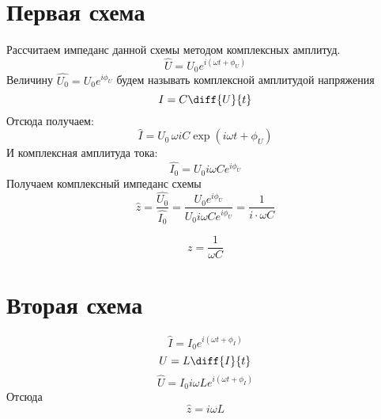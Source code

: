



\def\labauthors{Понур К.А., Сарафанов Ф.Г., Сидоров Д.А.}
\def\labgroup{420}
\def\labnumber{210}
\def\labtheme{Исследование линейных двухполюсников и четырёхполюсников}
\renewcommand{\vec}{\mathbf}
\renewcommand{\Re}{\operatorname{Re}}
\renewcommand{\Im}{\operatorname{Im}}



\tableofcontents
\newpage
\section{Первая схема}
\begin{center}
	
\end{center}

Рассчитаем импеданс данной схемы методом комплексных амплитуд.
\begin{equation}
	\hat{U}=U_0 e^{i(\omega t+\phi_U)}
\end{equation}
Величину $\hat{U_0}=U_0e^{i\phi_U}$ будем называть комплексной амплитудой напряжения
\begin{equation}
	I=C\diff{U}{t}
\end{equation}
Отсюда получаем:
\begin{equation}
	\hat{I}=U_0\,\omega i C\exp(i\omega t+\phi_U)
\end{equation}
И комплексная амплитуда тока:
\begin{equation}
	\hat{I_0}=U_0i\omega C e^{i\phi_U}
\end{equation}
Получаем комплексный импеданс схемы
\begin{equation}
	\hat{z}=\frac{\hat{U_0}}{\hat{I_0}}=\frac{U_0e^{i\phi_U}}{U_0i\omega C e^{i\phi_U}}=\frac{1}{i\cdot\omega C}
\end{equation}

\begin{equation}
	z=\frac{1}{\omega C}
\end{equation}
\section{Вторая схема}
\begin{center}

\end{center}

\begin{equation}
	\hat{I}=I_0e^{i(\omega t+\phi_I)}
\end{equation}
\begin{equation}
	U=L\diff{I}{t}
\end{equation}
\begin{equation}
	\hat{U}=I_0i\omega L e^{i(\omega t +\phi_I)}
\end{equation}
Отсюда
\begin{equation}
	\hat{z}=i\omega L
	\end{equation}




